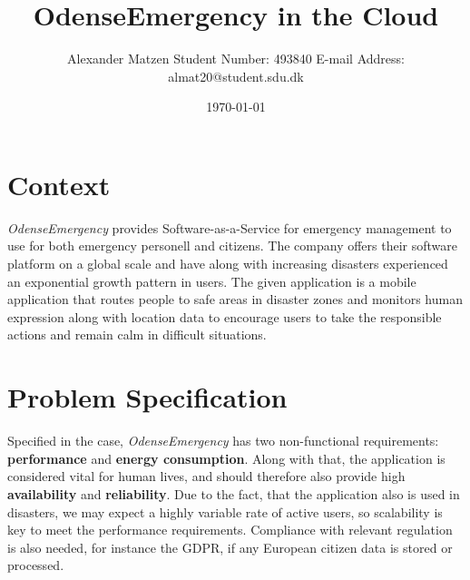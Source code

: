 \documentclass[11pt]{article}
\begin{document}
\setlength\parindent{0pt}
\setlength{\parskip}{.15em}
\pagestyle{empty}

\title{OdenseEmergency in the Cloud \newline}
\author{Alexander Matzen \addvspace{1em} Student Number: 493840 \newline E-mail Address: almat20@student.sdu.dk}
\date{\today}


\pagecolor{white}


\section{Context}

\textit{OdenseEmergency} provides Software-as-a-Service for emergency management to use for both emergency personell and citizens. The company offers their software platform on a global scale and have along with increasing disasters experienced an exponential growth pattern in users.
\newline\newline
The given application is a mobile application that routes people to safe areas in disaster zones and monitors human expression along with location data to encourage users to take the responsible actions and remain calm in difficult situations.

\section{Problem Specification}

Specified in the case, \textit{OdenseEmergency} has two non-functional requirements: \textbf{performance} and \textbf{energy consumption}. Along with that, the application is considered vital for human lives, and should therefore also provide high \textbf{availability} and \textbf{reliability}.
\newline\newline
Due to the fact, that the application also is used in disasters, we may expect a highly variable rate of active users, so scalability is key to meet the performance requirements.
\newline\newline
Compliance with relevant regulation is also needed, for instance the GDPR, if any European citizen data is stored or processed.
\end{document}
